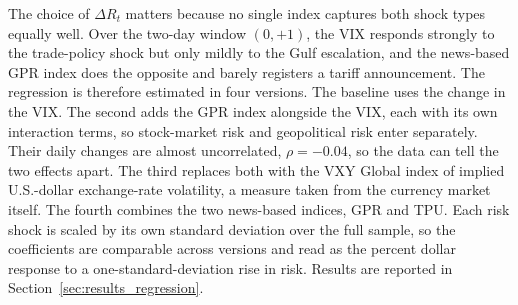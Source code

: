 The choice of $\Delta R_t$ matters because no single index captures both shock types equally well. Over the two-day window $(0,+1)$, the VIX responds strongly to the trade-policy shock but only mildly to the Gulf escalation, and the news-based GPR index does the opposite and barely registers a tariff announcement. The regression is therefore estimated in four versions. The baseline uses the change in the VIX. The second adds the GPR index alongside the VIX, each with its own interaction terms, so stock-market risk and geopolitical risk enter separately. Their daily changes are almost uncorrelated, $\rho=-0.04$, so the data can tell the two effects apart. The third replaces both with the VXY Global index of implied U.S.-dollar exchange-rate volatility, a measure taken from the currency market itself. The fourth combines the two news-based indices, GPR and TPU. Each risk shock is scaled by its own standard deviation over the full sample, so the coefficients are comparable across versions and read as the percent dollar response to a one-standard-deviation rise in risk. Results are reported in Section~\ref{sec:results_regression}.

